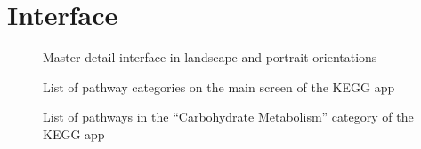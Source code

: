 \section{Interface}
\label{sect:kegg_interface}


\begin{figure}
    \caption{\label{fig:kegg_master_detail} Master-detail interface in landscape
    and portrait orientations}
\end{figure}

\begin{figure}
    \caption{\label{fig:kegg_screenshot_list} List of pathway categories on
    the main screen of the KEGG app}
\end{figure}

\begin{figure}
    \caption{\label{fig:kegg_screenshot_sublist} List of pathways in the
    ``Carbohydrate Metabolism'' category of the KEGG app}
\end{figure}


